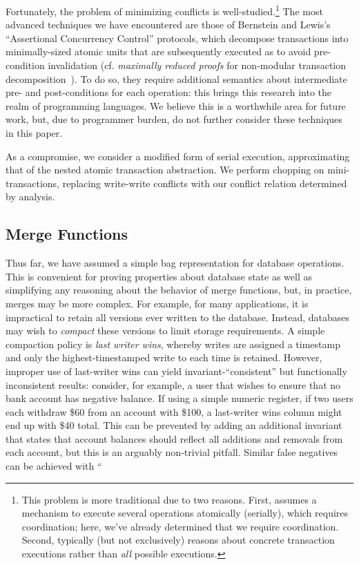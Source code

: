 Fortunately, the problem of minimizing conflicts is
well-studied.\footnote{This problem is more traditional due to two
  reasons. First, assumes a mechanism to execute several operations
  atomically (serially), which requires coordination; here, we've
  already determined that we require coordination. Second, typically
  (but not exclusively) reasons about concrete transaction executions
  rather than \textit{all} possible executions.} The most advanced
techniques we have encountered are those of Bernstein and Lewis's
``Assertional Concurrency Control'' protocols, which decompose
transactions into minimally-sized atomic units that are subsequently
executed as to avoid pre-condition invalidation (cf. \textit{maximally
  reduced proofs} for non-modular transaction
decomposition~\cite{decomp-semantics}). To do so, they require
additional semantics about intermediate pre- and post-conditions for
each operation: this brings this research into the realm of
programming languages. We believe this is a worthwhile area for future
work, but, due to programmer burden, do not further consider these
techniques in this paper.

As a compromise, we consider a modified form of serial execution,
approximating that of the nested atomic transaction abstraction. We
perform chopping on mini-transactions, replacing write-write conflicts
with our conflict relation determined by \iconfluence analysis.



\subsection{Merge Functions}

Thus far, we have assumed a simple bag representation for database
operations. This is convenient for proving properties about database
state as well as simplifying any reasoning about the behavior of merge
functions, but, in practice, merges may be more complex. For example,
for many applications, it is impractical to retain all versions ever
written to the database. Instead, databases may wish to
\textit{compact} these versions to limit storage requirements. A
simple compaction policy is \textit{last writer wins}, whereby writes
are assigned a timestamp and only the highest-timestamped write to
each time is retained. However, improper use of last-writer wins can
yield invariant-``consistent'' but functionally inconsistent results:
consider, for example, a user that wishes to ensure that no bank
account has negative balance. If using a simple numeric register, if
two users each withdraw \$60 from an account with \$100, a last-writer
wins column might end up with \$40 total. This can be prevented by
adding an additional invariant that states that account balances
should reflect all additions and removals from each account, but this
is an arguably non-trivial pitfall. Similar false negatives can be
achieved with ``

